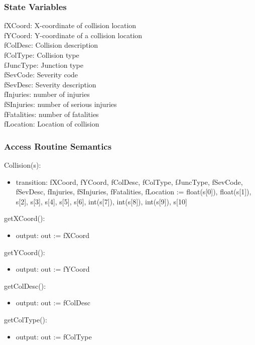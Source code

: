 \documentclass[12pt]{article}
\begin{document}
\subsubsection*{State Variables}
fXCoord: X-coordinate of collision location\\
fYCoord: Y-coordinate of a collision location\\
fColDesc: Collision description\\
fColType: Collision type\\
fJuncType: Junction type\\
fSevCode: Severity code\\
fSevDesc: Severity description\\
fInjuries: number of injuries\\
fSInjuries: number of serious injuries\\
fFatalities: number of fatalities\\
fLocation: Location of collision

\subsubsection*{Access Routine Semantics}

\noindent Collision(s):
\begin{itemize}
    \item transition: fXCoord, fYCoord, fColDesc, fColType, fJuncType, fSevCode, fSevDesc, fInjuries, fSInjuries, fFatalities, fLocation := float(s[0]), float(s[1]), s[2], s[3], s[4], s[5], s[6], int(s[7]), int(s[8]), int(s[9]), s[10]
\end{itemize}

\noindent getXCoord():
\begin{itemize}
    \item output: out := fXCoord
\end{itemize}

\noindent getYCoord():
\begin{itemize}
    \item output: out := fYCoord
\end{itemize}

\noindent getColDesc():
\begin{itemize}
    \item output: out := fColDesc
\end{itemize}

\noindent getColType():
\begin{itemize}
    \item output: out := fColType
\end{itemize}
\end{document}
